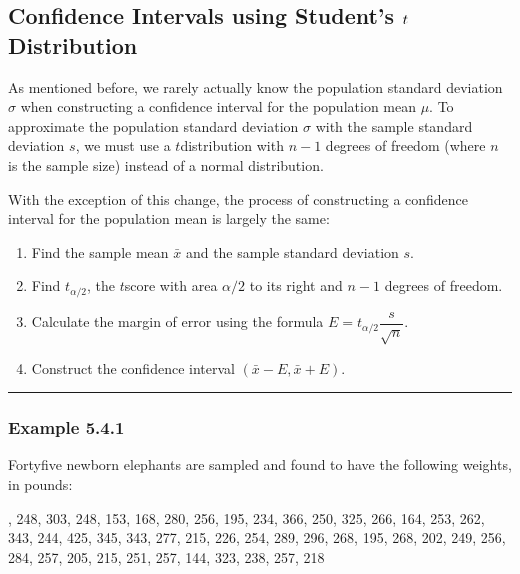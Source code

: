 \documentclass[letterpaper,10pt,english]{jupyterBook}
\begin{document}
\subsection{Confidence Intervals using Student’s \protect\(t\protect\)\sphinxhyphen{}Distribution}
\label{\detokenize{Ch5 Confidence Intervals/5.4 Estimating Population Means (Sigma Unknown):confidence-intervals-using-student-s-t-distribution}}
\sphinxAtStartPar
As mentioned before, we rarely actually know the population standard deviation \(\sigma\) when constructing a confidence interval for the population mean \(\mu\). To approximate the population standard deviation \(\sigma\) with the sample standard deviation \(s\), we must use a \(t\)\sphinxhyphen{}distribution with \(n - 1\) degrees of freedom (where \(n\) is the sample size) instead of a normal distribution.

\sphinxAtStartPar
With the exception of this change, the process of constructing a confidence interval for the population mean is largely the same:
\begin{enumerate}
%
\item {} 
\sphinxAtStartPar
Find the sample mean \(\bar{x}\) and the sample standard deviation \(s\).

\item {} 
\sphinxAtStartPar
Find \(t_{\alpha/2}\), the \(t\)\sphinxhyphen{}score with area \(\alpha/2\) to its right and \(n-1\) degrees of freedom.

\item {} 
\sphinxAtStartPar
Calculate the margin of error using the formula \(E = t_{\alpha/2} \dfrac{s}{\sqrt{n}}\).

\item {} 
\sphinxAtStartPar
Construct the confidence interval \((\bar{x} - E, \bar{x} + E)\).

\end{enumerate}


\bigskip\hrule\bigskip



\subsubsection{Example 5.4.1}
\label{\detokenize{Ch5 Confidence Intervals/5.4 Estimating Population Means (Sigma Unknown):example-5-4-1}}
\sphinxAtStartPar
Forty\sphinxhyphen{}five newborn elephants are sampled and found to have the following weights, in pounds:

, 248, 303, 248, 153, 168, 280, 256, 195, 234, 366, 250, 325, 266, 164, 253, 262, 343, 244, 425, 345, 343, 277, 215, 226, 254, 289, 296, 268, 195, 268, 202, 249, 256, 284, 257, 205, 215, 251, 257, 144, 323, 238, 257, 218
\end{document}
